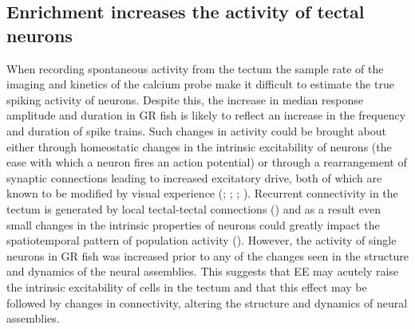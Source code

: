 \subsection{Enrichment increases the activity of tectal neurons}
When recording spontaneous activity from the tectum the sample rate of the imaging and kinetics of the calcium probe make it difficult to estimate the true spiking activity of neurons. Despite this, the increase in median response amplitude and duration in GR fish is likely to reflect an increase in the frequency and duration of spike trains. Such changes in activity could be brought about either through homeostatic changes in the intrinsic excitability of neurons (the ease with which a neuron fires an action potential) or through a rearrangement of synaptic connections leading to increased excitatory drive, both of which are known to be modified by visual experience (\cite{Aizenman2003VisuallyVivo}; \cite{Pratt2007HomeostaticCircuit}; \cite{Pratt2008DevelopmentTectum}; \cite{Mu2006SpikeSystem}). Recurrent connectivity in the tectum is generated by local tectal-tectal connections (\cite{Pratt2008DevelopmentTectum}) and as a result even small changes in the intrinsic properties of neurons could greatly impact the spatiotemporal pattern of population activity  (\cite{Pratt2016AnDevelopment}). However,  the activity of single neurons in GR fish was increased prior to any of the changes seen in the structure and dynamics of the neural assemblies. This suggests that EE may acutely raise the intrinsic excitability of cells in the tectum and that this effect may be followed by changes in connectivity, altering the structure and dynamics of neural assemblies.

